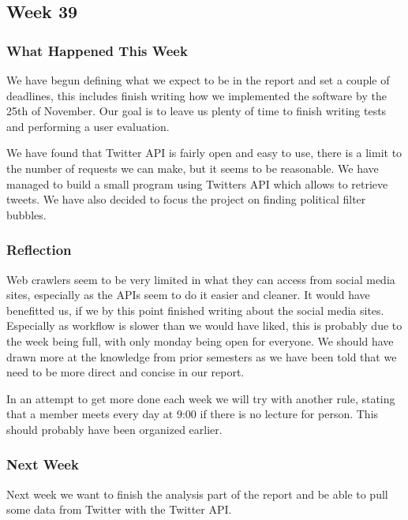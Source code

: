 \subsection{Week 39}
\subsubsection{What Happened This Week}
We have begun defining what we expect to be in the report and set a couple of
deadlines, this includes finish writing how we implemented the software by the
25th of November. Our goal is to leave us plenty of time to finish writing
tests and performing a user evaluation.\nl

We have found that Twitter \ac{API} is fairly open and easy to use, there is a
limit to the number of requests we can make, but it seems to be reasonable. We
have managed to build a small program using Twitters API which allows to
retrieve tweets. We have also decided to focus the project on finding political
filter bubbles.\nl



\subsubsection{Reflection}
Web crawlers seem to be very limited in what they can access from social media
sites, especially as the APIs seem to do it easier and cleaner. It would have
benefitted us, if we by this point finished writing about the social media
sites. Especially as workflow is slower than we would have liked, this is
probably due to the week being full, with only monday being open for everyone.
We should have drawn more at the knowledge from prior semesters as we have been
told that we need to be more direct and concise in our report.\nl

In an attempt to get more done each week we will try with another rule, stating
that a member meets every day at 9:00 if there is no lecture for person. This
should probably have been organized earlier.

\subsubsection{Next Week}
Next week we want to finish the analysis part of the report and be able to pull
some data from Twitter with the Twitter \ac{API}.
	



